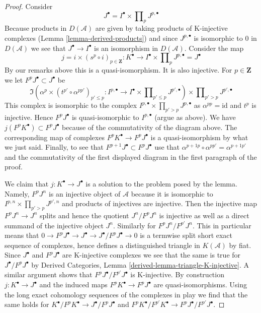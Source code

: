 \begin{proof}
\medskip\noindent
Consider
$$
J^\bullet = I^\bullet \times \prod\nolimits_p J^{p, \bullet}
$$
Because products in $D(\mathcal{A})$ are given by taking
products of K-injective complexes
(Lemma \ref{lemma-derived-products})
and since $J^{p, \bullet}$
is isomorphic to $0$ in $D(\mathcal{A})$ we see that
$J^\bullet \to I^\bullet$ is an isomorphism in $D(\mathcal{A})$.
Consider the map
$$
j = i \times (s^p \circ i)_{p \in \mathbf{Z}} :
K^\bullet
\longrightarrow
I^\bullet \times \prod\nolimits_p J^{p, \bullet} = J^\bullet
$$
By our remarks above this is a quasi-isomorphism. It is also injective.
For $p \in \mathbf{Z}$ we let $F^pJ^\bullet \subset J^\bullet$ be
$$
\Im\left(
\alpha^p \times (t^{p'} \circ \alpha^{pp'})_{p' \leq p} :
I^{p, \bullet}
\to
I^\bullet \times \prod\nolimits_{p' \leq p} J^{p', \bullet}
\right)
\times \prod\nolimits_{p' > p} J^{p', \bullet}
$$
This complex is isomorphic to the complex
$I^{p, \bullet} \times \prod_{p' > p} J^{p, \bullet}$
as $\alpha^{pp} = \text{id}$ and $t^p$ is injective.
Hence $F^pJ^\bullet$ is quasi-isomorphic to $I^{p, \bullet}$ (argue
as above). We have $j(F^pK^\bullet) \subset F^pJ^\bullet$ because
of the commutativity of the diagram above. The corresponding
map of complexes $F^pK^\bullet \to F^pJ^\bullet$ is a quasi-isomorphism
by what we just said. Finally, to see that
$F^{p + 1}J^\bullet \subset F^pJ^\bullet$
use that $\alpha^{p + 1p} \circ \alpha^{pp'} = \alpha^{p + 1p'}$
and the commutativity of the first displayed diagram
in the first paragraph of the proof.

\medskip\noindent
We claim that $j : K^\bullet \to J^\bullet$ is a solution to the
problem posed by the lemma. Namely, $F^pJ^n$ is an injective object
of $\mathcal{A}$ because it is isomorphic to
$I^{p, n} \times \prod_{p' > p} J^{p', n}$ and products of
injectives are injective. Then the injective map $F^pJ^n \to J^n$
splits and hence the quotient $J^n/F^pJ^n$ is injective as well
as a direct summand of the injective object $J^n$.
Similarly for $F^pJ^n/F^{p'}J^n$. This in particular means
that $0 \to F^pJ^\bullet \to J^\bullet \to J^\bullet/F^pJ^\bullet \to 0$
is a termwise split short exact sequence of complexes, hence defines
a distinguished triangle in $K(\mathcal{A})$ by fiat.
Since $J^\bullet$ and $F^pJ^\bullet$ are K-injective complexes
we see that the same is true for $J^\bullet/F^pJ^\bullet$
by Derived Categories, Lemma \ref{derived-lemma-triangle-K-injective}.
A similar argument shows that $F^pJ^\bullet/F^{p'}J^\bullet$
is K-injective. By construction $j : K^\bullet \to J^\bullet$
and the induced maps $F^pK^\bullet \to F^pJ^\bullet$ are
quasi-isomorphisms. Using the long exact cohomology sequences
of the complexes in play we find that the same holds for
$K^\bullet/F^pK^\bullet \to J^\bullet/F^pJ^\bullet$ and
$F^pK^\bullet/F^{p'}K^\bullet \to F^pJ^\bullet/F^{p'}J^\bullet$.
\end{proof}














